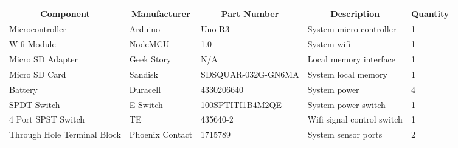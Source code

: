 \documentclass[12pt, titlepage]{article}
\begin{document}
\begin{table}[H]
  \centering
  \begin{tabular}{|p{3cm}|p{2cm}|p{4cm}|p{4cm}|p{2cm}|}
  \hline
  \multicolumn{1}{|c|}{\textbf{Component}} & \multicolumn{1}{c|}{\textbf{Manufacturer}} & \multicolumn{1}{c|}{\textbf{Part Number}} & \multicolumn{1}{c|}{\textbf{Description}} & \multicolumn{1}{|c|}{\textbf{Quantity}}
  \\ \hline
  Microcontroller
  & Arduino
  & Uno R3
  & System micro-controller
  & 1
  \newline                                
  \\ \hline

  Wifi Module                              
  & NodeMCU
  & 1.0
  & System wifi 
  & 1
  \newline                                
  \\ \hline

  Micro SD Adapter                          
  & Geek Story
  & N/A
  & Local memory interface
  & 1
  \newline                                
  \\ \hline

  Micro SD Card                                
  & Sandisk
  & SDSQUAR-032G-GN6MA
  & System local memory
  & 1
  \newline                            
  \\ \hline

  Battery                                
  & Duracell
  & 4330206640
  & System power
  & 4
  \newline                            
  \\ \hline

  SPDT Switch                                
  & E-Switch
  & 100SPTITI1B4M2QE
  & System power switch
  & 1
  \newline                            
  \\ \hline

  4 Port SPST Switch                                
  & TE
  & 435640-2
  & Wifi signal control switch
  & 1
  \newline                            
  \\ \hline

  Through Hole Terminal Block                                
  & Phoenix Contact
  & 1715789
  & System sensor ports
  & 2
  \newline                            
  \\ \hline


\end{tabular}
\end{table}
\end{document}
